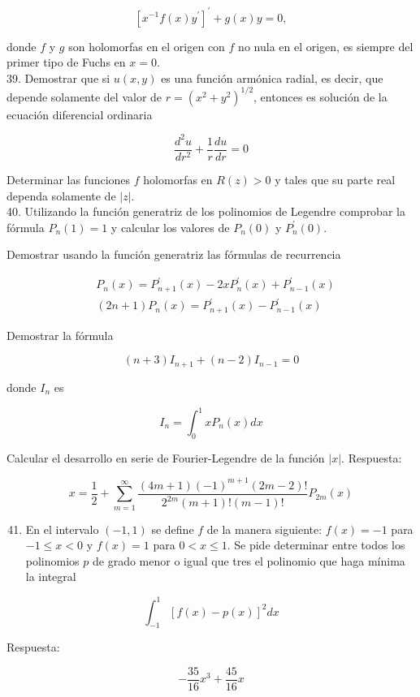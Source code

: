 \documentclass[10pt]{article}
\theoremstyle{plain}
\theoremstyle{definition}
\theoremstyle{remark}
\begin{document}
$$
\left[x^{-1} f(x) y^{\prime}\right]^{\prime}+g(x) y=0,
$$

donde $f$ y $g$ son holomorfas en el origen con $f$ no nula en el origen, es siempre del primer tipo de Fuchs en $x=0$.\\
39. Demostrar que si $u(x, y)$ es una función armónica radial, es decir, que depende solamente del valor de $r=\left(x^{2}+y^{2}\right)^{1 / 2}$, entonces es solución de la ecuación diferencial ordinaria

$$
\frac{d^{2} u}{d r^{2}}+\frac{1}{r} \frac{d u}{d r}=0
$$

Determinar las funciones $f$ holomorfas en $R(z)>0$ y tales que su parte real dependa solamente de $|z|$.\\
40. Utilizando la función generatriz de los polinomios de Legendre comprobar la fórmula $P_{n}(1)=1$ y calcular los valores de $P_{n}(0)$ y $P_{n}^{\prime}(0)$.

Demostrar usando la función generatriz las fórmulas de recurrencia

$$
\begin{aligned}
& P_{n}(x)=P_{n+1}^{\prime}(x)-2 x P_{n}^{\prime}(x)+P_{n-1}^{\prime}(x) \\
& (2 n+1) P_{n}(x)=P_{n+1}^{\prime}(x)-P_{n-1}^{\prime}(x)
\end{aligned}
$$

Demostrar la fórmula

$$
(n+3) I_{n+1}+(n-2) I_{n-1}=0
$$

donde $I_{n}$ es

$$
I_{n}=\int_{0}^{1} x P_{n}(x) d x
$$

Calcular el desarrollo en serie de Fourier-Legendre de la función $|x|$. Respuesta:

$$
x=\frac{1}{2}+\sum_{m=1}^{\infty} \frac{(4 m+1)(-1)^{m+1}(2 m-2)!}{2^{2 m}(m+1)!(m-1)!} P_{2 m}(x)
$$

\begin{enumerate}
  \setcounter{enumi}{40}
  \item En el intervalo $(-1,1)$ se define $f$ de la manera siguiente: $f(x)=-1$ para $-1 \leqslant x<0$ y $f(x)=1$ para $0<x \leqslant 1$. Se pide determinar entre todos los polinomios $p$ de grado menor o igual que tres el polinomio que haga mínima la integral
\end{enumerate}

$$
\int_{-1}^{1}[f(x)-p(x)]^{2} d x
$$

Respuesta:

$$
-\frac{35}{16} x^{3}+\frac{45}{16} x
$$
\end{document}
